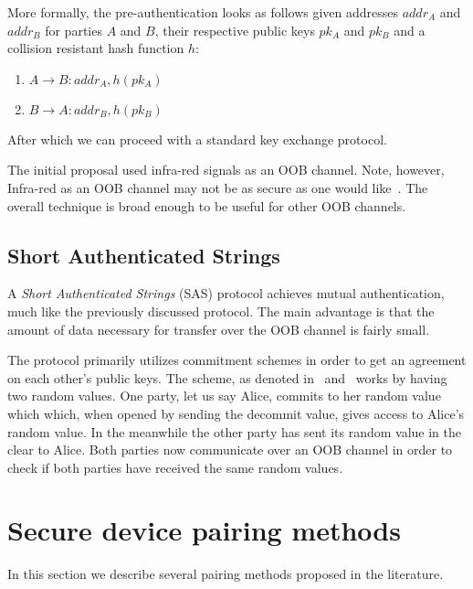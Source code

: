 \documentclass[conference, 11pt]{sty/IEEEtran}
\begin{document}
More formally, the pre-authentication looks as follows given addresses $addr_A$ and $addr_B$ for parties $A$ and $B$, their respective public keys $pk_A$ and $pk_B$ and a collision resistant hash function $h$:

\begin{enumerate}
    \item $A \rightarrow B: addr_A, h(pk_A)$
    \item $B \rightarrow A: addr_B, h(pk_B)$
\end{enumerate}

After which we can proceed with a standard key exchange protocol.

The initial proposal used infra-red signals as an OOB channel.
Note, however, Infra-red as an OOB channel may not be as secure as one would like~\cite{kumar2009comparative}.
The overall technique is broad enough to be useful for other OOB channels.

\subsection{Short Authenticated Strings}
\label{ssec:short_authenticated_strings}

A \emph{Short Authenticated Strings} (SAS) protocol achieves mutual authentication, much like the previously discussed protocol.
The main advantage is that the amount of data necessary for transfer over the OOB channel is fairly small.

The protocol primarily utilizes commitment schemes in order to get an agreement on each other's public keys.
The scheme, as denoted in~\cite{saxena2008automated} and~\cite{saxena2006secure} works by having two random values.
One party, let us say Alice, commits to her random value which which, when opened by sending the decommit value, gives access to Alice's random value.
In the meanwhile the other party has sent its random value in the clear to Alice.
Both parties now communicate over an OOB channel in order to check if both parties have received the same random values.

\section{Secure device pairing methods}
\label{sec:secure_device_pairing_methods}

In this section we describe several pairing methods proposed in the literature.
\end{document}
